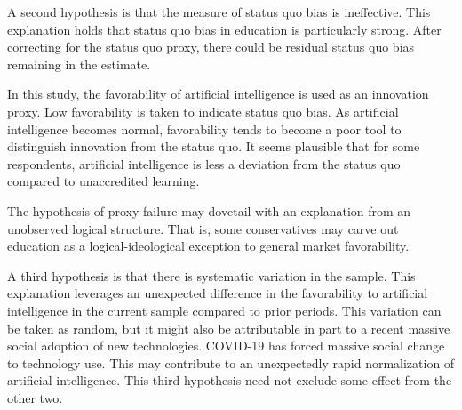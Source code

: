 \documentclass[review]{elsarticle}
\begin{document}
A second hypothesis is that the measure of status quo bias is ineffective.
This explanation holds that status quo bias in education is particularly strong.
After correcting for the status quo proxy, there could be residual status quo bias remaining in the estimate.

In this study, the favorability of artificial intelligence is used as an innovation proxy.
Low favorability is taken to indicate status quo bias.
As artificial intelligence becomes normal,
favorability tends to become a poor tool to distinguish innovation from the status quo.
It seems plausible that for some respondents,
artificial intelligence is less a deviation from the status quo
compared to unaccredited learning.

The hypothesis of proxy failure may dovetail with an explanation from an unobserved logical structure.
That is, some conservatives may carve out education as a logical-ideological exception to general market favorability.

A third hypothesis is that there is systematic variation in the sample.
This explanation leverages an unexpected difference in the favorability to artificial intelligence
in the current sample compared to prior periods.
This variation can be taken as random,
but it might also be attributable in part to a recent massive social adoption of new technologies.
COVID-19 has forced massive social change to technology use.
This may contribute to an unexpectedly rapid normalization of artificial intelligence.
This third hypothesis need not exclude some effect from the other two.


\end{document}
